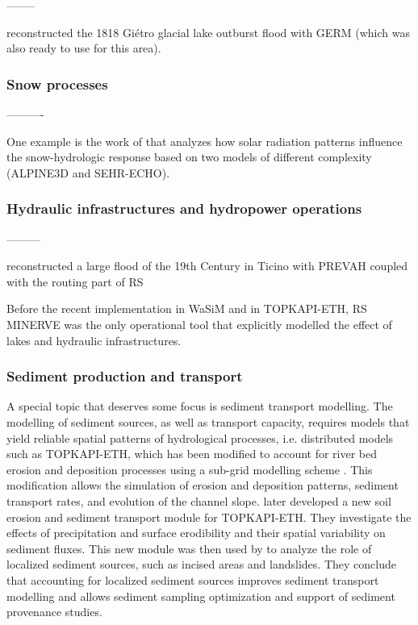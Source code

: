 \documentclass[10pt,a4paper]{article}
\begin{document}
--------

\citet{Ancey2019} reconstructed the 1818 Giétro glacial lake outburst flood with GERM (which was also ready to use for this area).

\subsubsection{Snow processes}
\label{sec:application:snow}




----------

One example is the work of \citet{Comola2015a} that analyzes how solar radiation patterns influence the snow-hydrologic response based on two models of different complexity (ALPINE3D and SEHR-ECHO).


\subsubsection{Hydraulic infrastructures and hydropower operations}
\label{sec:application:infrastructures}



---------

\citet{Stucki2018} reconstructed a large flood of the 19th Century in Ticino with PREVAH coupled with the routing part of RS 

Before the recent implementation in WaSiM and in TOPKAPI-ETH, RS MINERVE was the only operational tool that explicitly modelled the effect of lakes and hydraulic infrastructures.
  

\subsubsection{Sediment production and transport}
\label{sec:application:sediments}

A special topic that deserves some focus is sediment transport modelling. The modelling of sediment sources, as well as transport capacity, requires models that yield reliable spatial patterns of hydrological processes, i.e. distributed models such as TOPKAPI-ETH, which has been modified to account for river bed erosion and deposition processes using a sub-grid modelling scheme \citep{Konz2011}. This modification allows the simulation of erosion and deposition patterns, sediment transport rates, and evolution of the channel slope. \citet{Battista2020a} later developed a new soil erosion and sediment transport module for TOPKAPI-ETH. They investigate the effects of precipitation and surface erodibility and their spatial variability on sediment fluxes. This new module was then used by \citet{Battista2020} to analyze the role of localized sediment sources, such as incised areas and landslides. They conclude that accounting for localized sediment sources improves sediment transport modelling and allows sediment sampling optimization and support of sediment provenance studies.
\end{document}
